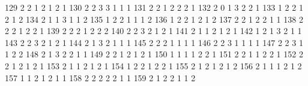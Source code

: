 \documentclass[
  letterpaper,
  DIV=11,
  numbers=noendperiod]{scrreprt}
\newenvironment{Shaded}{\begin{snugshade}}{\end{snugshade}}
\newcommand{\NormalTok}[1]{\textcolor[rgb]{0.00,0.23,0.31}{#1}}
\begin{document}
\begin{Shaded}
\begin{Highlighting}[]
\NormalTok{129              2     2         1            2        1         2      1}
\NormalTok{130              2     2         3            3        1         1      1}
\NormalTok{131              2     2         1            2        2         2      1}
\NormalTok{132              2     0         1            3        2         2      1}
\NormalTok{133              1     2         2            1        2         1      2}
\NormalTok{134              2     1         1            3        1         1      2}
\NormalTok{135              1     2         2            1        1         1      2}
\NormalTok{136              1     2         2            1        2         1      2}
\NormalTok{137              2     2         1            2        2         1      1}
\NormalTok{138              2     2         2            1        2         2      1}
\NormalTok{139              2     2         2            1        2         2      2}
\NormalTok{140              2     2         3            2        1         2      1}
\NormalTok{141              2     1         1            2        1         2      1}
\NormalTok{142              1     2         1            3        2         1      1}
\NormalTok{143              2     2         3            2        1         2      1}
\NormalTok{144              2     1         3            2        1         1      1}
\NormalTok{145              2     2         2            1        1         1      1}
\NormalTok{146              2     2         3            1        1         1      1}
\NormalTok{147              2     2         3            1        1         2      2}
\NormalTok{148              2     1         3            2        2         1      1}
\NormalTok{149              2     2         1            2        1         2      1}
\NormalTok{150              1     1         1            1        2         2      1}
\NormalTok{151              2     2         1            1        2         2      1}
\NormalTok{152              2     2         1            2        1         2      1}
\NormalTok{153              2     1         1            2        1         2      1}
\NormalTok{154              1     2         2            1        2         2      1}
\NormalTok{155              2     1         2            1        2         1      2}
\NormalTok{156              2     1         1            1        2         1      2}
\NormalTok{157              1     1         2            1        2         1      1}
\NormalTok{158              2     2         2            2        2         1      1}
\NormalTok{159              2     1         2            2        1         1      2}

\end{Highlighting}
\end{Shaded}
\end{document}
